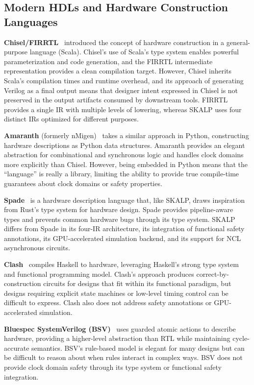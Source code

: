 \documentclass[conference]{IEEEtran}
\begin{document}
\subsection{Modern HDLs and Hardware Construction Languages}

\textbf{Chisel/FIRRTL}~\cite{chisel} introduced the concept of hardware construction in a general-purpose language (Scala). Chisel's use of Scala's type system enables powerful parameterization and code generation, and the FIRRTL intermediate representation provides a clean compilation target. However, Chisel inherits Scala's compilation times and runtime overhead, and its approach of generating Verilog as a final output means that designer intent expressed in Chisel is not preserved in the output artifacts consumed by downstream tools. FIRRTL provides a single IR with multiple levels of lowering, whereas SKALP uses four distinct IRs optimized for different purposes.

\textbf{Amaranth} (formerly nMigen)~\cite{amaranth} takes a similar approach in Python, constructing hardware descriptions as Python data structures. Amaranth provides an elegant abstraction for combinational and synchronous logic and handles clock domains more explicitly than Chisel. However, being embedded in Python means that the ``language'' is really a library, limiting the ability to provide true compile-time guarantees about clock domains or safety properties.

\textbf{Spade}~\cite{spade} is a hardware description language that, like SKALP, draws inspiration from Rust's type system for hardware design. Spade provides pipeline-aware types and prevents common hardware bugs through its type system. SKALP differs from Spade in its four-IR architecture, its integration of functional safety annotations, its GPU-accelerated simulation backend, and its support for NCL asynchronous circuits.

\textbf{Clash}~\cite{clash} compiles Haskell to hardware, leveraging Haskell's strong type system and functional programming model. Clash's approach produces correct-by-construction circuits for designs that fit within its functional paradigm, but designs requiring explicit state machines or low-level timing control can be difficult to express. Clash also does not address safety annotations or GPU-accelerated simulation.

\textbf{Bluespec SystemVerilog (BSV)}~\cite{bluespec} uses guarded atomic actions to describe hardware, providing a higher-level abstraction than RTL while maintaining cycle-accurate semantics. BSV's rule-based model is elegant for many designs but can be difficult to reason about when rules interact in complex ways. BSV does not provide clock domain safety through its type system or functional safety integration.
\end{document}

